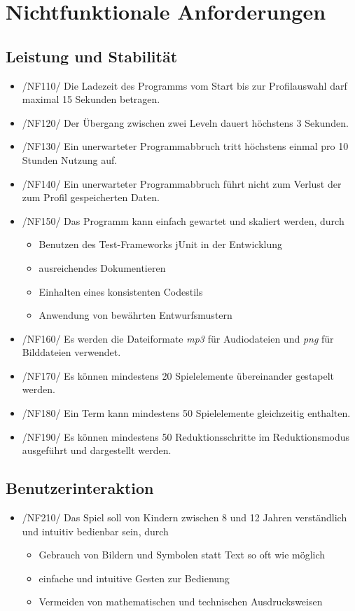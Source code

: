 \section{Nichtfunktionale Anforderungen}

\subsection{Leistung und Stabilität}

\begin{itemize}
\item /NF110/ Die Ladezeit des Programms vom Start bis zur Profilauswahl darf maximal 15 Sekunden betragen.
\item /NF120/ Der \"Ubergang zwischen zwei Leveln dauert höchstens 3 Sekunden.
\item /NF130/ Ein unerwarteter Programmabbruch tritt höchstens einmal pro 10 Stunden Nutzung auf.
\item /NF140/ Ein unerwarteter Programmabbruch führt nicht zum Verlust der zum Profil gespeicherten Daten.
\item /NF150/ Das Programm kann einfach gewartet und skaliert werden, durch
\begin{itemize}
\item Benutzen des Test-Frameworks jUnit in der Entwicklung
\item ausreichendes Dokumentieren
\item Einhalten eines konsistenten Codestils
\item Anwendung von bewährten Entwurfsmustern
\end{itemize}
\item /NF160/ Es werden die Dateiformate \textit{mp3} für Audiodateien und \textit{png} für Bilddateien verwendet.
\item /NF170/ Es können mindestens 20 Spielelemente übereinander gestapelt werden.
\item /NF180/ Ein Term kann mindestens 50 Spielelemente gleichzeitig enthalten.
\item /NF190/ Es können mindestens 50 Reduktionsschritte im Reduktionsmodus ausgeführt und dargestellt werden.
\end{itemize}

\subsection{Benutzerinteraktion}
\begin{itemize}
\item /NF210/ Das Spiel soll von Kindern zwischen 8 und 12 Jahren verständlich und intuitiv bedienbar sein, durch
\begin{itemize}
\item Gebrauch von Bildern und Symbolen statt Text so oft wie möglich
\item einfache und intuitive Gesten zur Bedienung
\item Vermeiden von mathematischen und technischen Ausdrucksweisen
\end{itemize}
\end{itemize}

